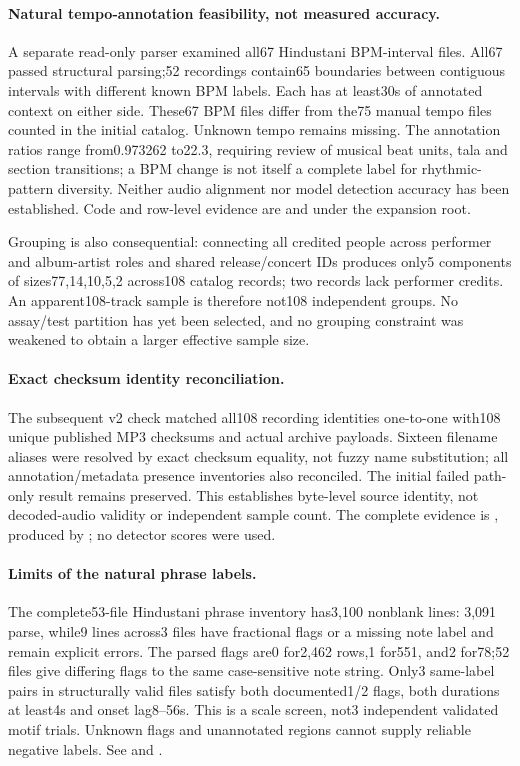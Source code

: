 \paragraph{Natural tempo-annotation feasibility, not measured accuracy.}
A separate read-only parser examined all67 Hindustani BPM-interval files.
All67 passed structural parsing;52 recordings contain65 boundaries between
contiguous intervals with different known BPM labels. Each has at least30s of
annotated context on either side. These67 BPM files differ from the75 manual
tempo files counted in the initial catalog. Unknown tempo remains missing.
The annotation ratios range from0.973262 to22.3, requiring review of musical
beat units, tala and section transitions; a BPM change is not itself a complete
label for rhythmic-pattern diversity. Neither audio alignment nor model detection
accuracy has been established. Code and row-level evidence are
 and
 under the expansion root.

Grouping is also consequential: connecting all credited people across performer
and album-artist roles and shared release/concert IDs produces only5 components
of sizes77,14,10,5,2 across108 catalog records; two records lack performer
credits. An apparent108-track sample is therefore not108 independent groups.
No assay/test partition has yet been selected, and no grouping constraint was
weakened to obtain a larger effective sample size.

\paragraph{Exact checksum identity reconciliation.}
The subsequent v2 check matched all108 recording identities one-to-one with108
unique published MP3 checksums and actual archive payloads. Sixteen filename
aliases were resolved by exact checksum equality, not fuzzy name substitution;
all annotation/metadata presence inventories also reconciled. The initial failed
path-only result remains preserved. This establishes byte-level source identity,
not decoded-audio validity or independent sample count. The complete evidence is
, produced by
; no detector scores were used.

\paragraph{Limits of the natural phrase labels.}
The complete53-file Hindustani phrase inventory has3,100 nonblank lines:
3,091 parse, while9 lines across3 files have fractional flags or a missing note
label and remain explicit errors. The parsed flags are0 for2,462 rows,1 for551,
and2 for78;52 files give differing flags to the same case-sensitive note string.
Only3 same-label pairs in structurally valid files satisfy both documented1/2
flags, both durations at least4s and onset lag8--56s. This is a scale screen,
not3 independent validated motif trials. Unknown flags and unannotated regions
cannot supply reliable negative labels. See
 and
.

